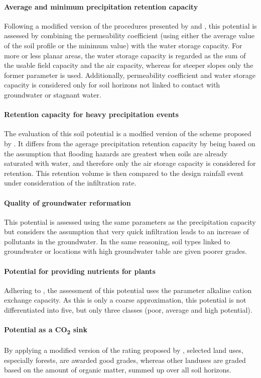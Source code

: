 \documentclass[preprint,12pt,authoryear]{elsarticle}
\begin{document}
\paragraph{Average and minimum precipitation retention capacity}
Following a modified version of the procedures presented by \cite{LUBW1995} and \cite{BAYGLA2003}, this potential is assessed by combining the permeability coefficient (using either the average value of the soil profile or the minimum value) with the water storage capacity. For more or less planar areas, the water storage capacity is regarded as  the sum of the usable field capacity and the air capacity, whereas for steeper slopes only the former parameter is used. Additionally, permeability coefficient and water storage capacity is considered only for soil horizons not linked to contact with groundwater or stagnant water.
\paragraph{Retention capacity for heavy precipitation events}
 The evaluation of this soil potential is a modfied version of the scheme proposed by \citep{Lehmann2008}. It differs from the agerage precipitation retention capacity by being based on the assumption that flooding hazards are greatest when soils are already saturated with water, and therefore only the air storage capacity is considered for retention. This retention volume is then compared to the design rainfall event under consideration of the infiltration rate.
\paragraph{Quality of groundwater reformation}
This potential is assessed using the same parameters as the precipitation capacity but considers the assumption that very quick infiltration leads to an increase of pollutants in the groundwater. In the same reasoning, soil types linked to groundwater or locations with high groundwater table are given poorer grades.

\paragraph{Potential for providing nutrients for plants}
Adhering to \citep{Mueller2011}, the assessment of this potential uses the parameter alkaline cation exchange capacity. As this is only a coarse approximation, this potential is not differentiated into five, but only three classes (poor, average and high potential).
\paragraph{Potential as a CO\textsubscript{2} sink}
By applying a modified version of the rating proposed by \cite{Gerstenberg2005}, selected land uses, especially forests, are awarded good grades, whereas other landuses are graded based on the amount of organic matter, summed up over all soil horizons.
\end{document}
